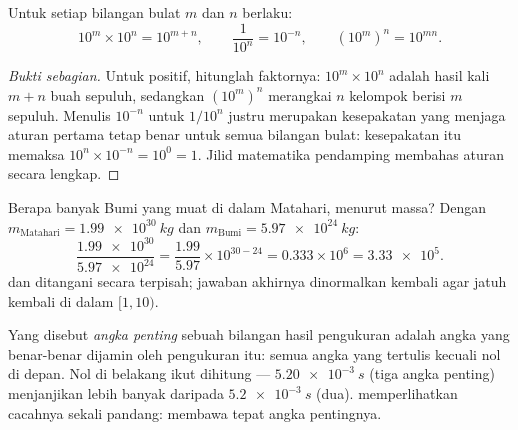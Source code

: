 \begin{proposition}\label{prop:g10:orders-of-magnitude:powers}
Untuk setiap bilangan bulat $m$ dan $n$ berlaku:
\[
10^{m} \times 10^{n} = 10^{m+n}, \qquad
\frac{1}{10^{n}} = 10^{-n}, \qquad
\left(10^{m}\right)^{n} = 10^{mn}.
\]
\end{proposition}

\begin{proof}[Bukti sebagian]
Untuk  positif, hitunglah faktornya: $10^{m} \times 10^{n}$
adalah hasil kali $m + n$ buah sepuluh, sedangkan $(10^m)^n$ merangkai
$n$ kelompok berisi $m$ sepuluh. Menulis $10^{-n}$ untuk $1/10^{n}$
justru merupakan kesepakatan yang menjaga aturan pertama tetap benar
untuk semua bilangan bulat: kesepakatan itu memaksa
$10^{n} \times 10^{-n} = 10^{0} = 1$. Jilid matematika pendamping
membahas aturan  secara lengkap.
\end{proof}

\begin{example}\label{ex:g10:orders-of-magnitude:scinot}
Berapa banyak Bumi yang muat di dalam Matahari, menurut massa? Dengan
$m_{\text{Matahari}} = \qty{1.99e30}{kg}$ dan
$m_{\text{Bumi}} = \qty{5.97e24}{kg}$:
\[
\frac{\num{1.99e30}}{\num{5.97e24}}
= \frac{1.99}{5.97} \times 10^{30-24}
= 0.333 \times 10^{6}
= \num{3.33e5}.
\]
 dan  ditangani secara terpisah; jawaban akhirnya
dinormalkan kembali agar  jatuh kembali di dalam $[1, 10)$.
\end{example}

\begin{definition}\label{def:g10:orders-of-magnitude:sigfig}
Yang disebut \emph{angka penting} sebuah bilangan
hasil pengukuran adalah angka yang benar-benar dijamin oleh pengukuran
itu: semua angka yang tertulis kecuali nol di depan. Nol di belakang
ikut dihitung --- $\qty{5.20e-3}{s}$ (tiga angka penting) menjanjikan
lebih banyak daripada $\qty{5.2e-3}{s}$ (dua). 
memperlihatkan cacahnya sekali pandang:  membawa tepat angka
pentingnya.
\end{definition}

